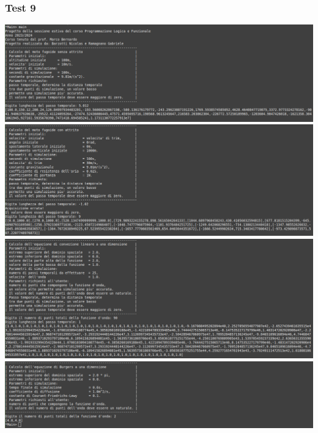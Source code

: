 \subsubsection*{Test 9}
\includegraphics[width=\textwidth,height=\textheight,keepaspectratio]{05_testing/image/hs/09_test/01_misto.png}
\\
\includegraphics[width=\textwidth,height=\textheight,keepaspectratio]{05_testing/image/hs/09_test/02_misto.png}
\\
\includegraphics[width=\textwidth,height=\textheight,keepaspectratio]{05_testing/image/hs/09_test/03_misto.png}
\\
\includegraphics[width=\textwidth,height=\textheight,keepaspectratio]{05_testing/image/hs/09_test/04_misto.png}

